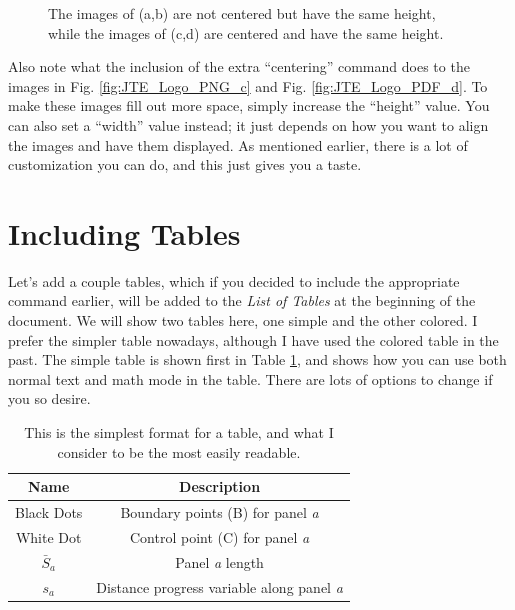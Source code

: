 \documentclass[letterpaper,12pt]{article}
\begin{document}
\begin{figure}[h]
    \caption{The images of (a,b) are not centered but have the same height, while the images of (c,d) are centered and have the same height.}
    \label{fig:Multiple_Figures_2x2}
\end{figure}

Also note what the inclusion of the extra ``centering'' command does to the images in Fig. \ref{fig:JTE_Logo_PNG_c} and Fig. \ref{fig:JTE_Logo_PDF_d}.  To make these images fill out more space, simply increase the ``height'' value.  You can also set a ``width'' value instead; it just depends on how you want to align the images and have them displayed.  As mentioned earlier, there is a lot of customization you can do, and this just gives you a taste.

\section{Including Tables}
\label{sec:Including_Tables}

Let's add a couple tables, which if you decided to include the appropriate command earlier, will be added to the \textit{List of Tables} at the beginning of the document.  We will show two tables here, one simple and the other colored.  I prefer the simpler table nowadays, although I have used the colored table in the past.  The simple table is shown first in Table \ref{tab:Simple}, and shows how you can use both normal text and math mode in the table.  There are lots of options to change if you so desire.

\begin{table}[H]
\setlength{\arrayrulewidth}{0.5mm}
\setlength{\tabcolsep}{12pt}
\renewcommand{\arraystretch}{1.5}
{
\begin{center}
\begin{tabular}{cc}
\hline
\rowcolor{white}
\color{black} Name & \color{black} Description \\[1ex]
\hline
Black Dots 							& Boundary points (B) for panel \textit{a}				\\
White Dot							& Control point (C) for panel \textit{a}				\\
$\bar{S}_a$ 						& Panel \textit{a} length 								\\
$s_a$								& Distance progress variable along panel \textit{a}		\\
\hline
\end{tabular}
\end{center}
}
\caption{This is the simplest format for a table, and what I consider to be the most easily readable.}
\label{tab:Simple}
\end{table}
\end{document}
